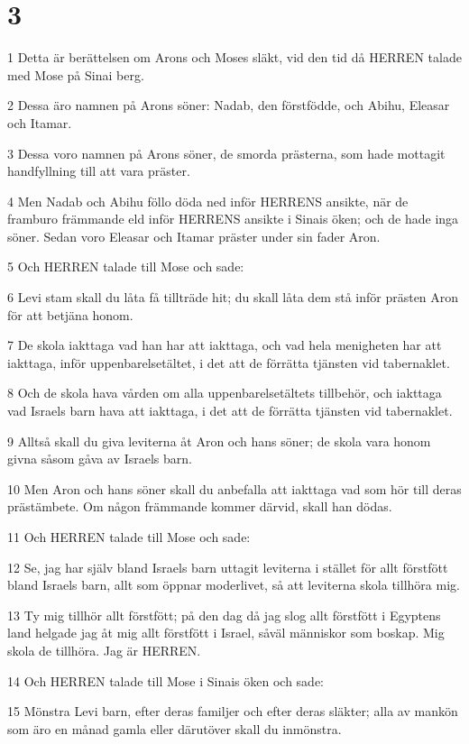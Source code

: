 \chapter{3}

\par 1 Detta är berättelsen om Arons och Moses släkt, vid den tid då HERREN talade med Mose på Sinai berg.
\par 2 Dessa äro namnen på Arons söner: Nadab, den förstfödde, och Abihu, Eleasar och Itamar.
\par 3 Dessa voro namnen på Arons söner, de smorda prästerna, som hade mottagit handfyllning till att vara präster.
\par 4 Men Nadab och Abihu föllo döda ned inför HERRENS ansikte, när de framburo främmande eld inför HERRENS ansikte i Sinais öken; och de hade inga söner. Sedan voro Eleasar och Itamar präster under sin fader Aron.
\par 5 Och HERREN talade till Mose och sade:
\par 6 Levi stam skall du låta få tillträde hit; du skall låta dem stå inför prästen Aron för att betjäna honom.
\par 7 De skola iakttaga vad han har att iakttaga, och vad hela menigheten har att iakttaga, inför uppenbarelsetältet, i det att de förrätta tjänsten vid tabernaklet.
\par 8 Och de skola hava vården om alla uppenbarelsetältets tillbehör, och iakttaga vad Israels barn hava att iakttaga, i det att de förrätta tjänsten vid tabernaklet.
\par 9 Alltså skall du giva leviterna åt Aron och hans söner; de skola vara honom givna såsom gåva av Israels barn.
\par 10 Men Aron och hans söner skall du anbefalla att iakttaga vad som hör till deras prästämbete. Om någon främmande kommer därvid, skall han dödas.
\par 11 Och HERREN talade till Mose och sade:
\par 12 Se, jag har själv bland Israels barn uttagit leviterna i stället för allt förstfött bland Israels barn, allt som öppnar moderlivet, så att leviterna skola tillhöra mig.
\par 13 Ty mig tillhör allt förstfött; på den dag då jag slog allt förstfött i Egyptens land helgade jag åt mig allt förstfött i Israel, såväl människor som boskap. Mig skola de tillhöra. Jag är HERREN.
\par 14 Och HERREN talade till Mose i Sinais öken och sade:
\par 15 Mönstra Levi barn, efter deras familjer och efter deras släkter; alla av mankön som äro en månad gamla eller därutöver skall du inmönstra.
